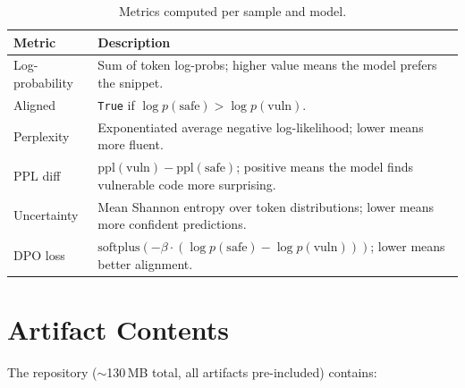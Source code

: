 \documentclass[conference]{IEEEtran}
\begin{document}
\begin{table}[h]
\centering
\caption{Metrics computed per sample and model.}
\label{tab:metrics}
\footnotesize
\begin{tabular}{p{1.8cm}p{5.5cm}}
\toprule
\textbf{Metric} & \textbf{Description} \\
\midrule
Log-probability & Sum of token log-probs; higher value means the model
                  prefers the snippet. \\
Aligned         & \texttt{True} if $\log p(\text{safe}) > \log p(\text{vuln})$. \\
Perplexity      & Exponentiated average negative log-likelihood; lower
                  means more fluent. \\
PPL diff        & $\text{ppl}(\text{vuln}) - \text{ppl}(\text{safe})$;
                  positive means the model finds vulnerable code more surprising. \\
Uncertainty     & Mean Shannon entropy over token distributions; lower means
                  more confident predictions. \\
DPO loss        & $\text{softplus}(-\beta \cdot (\log p(\text{safe}) -
                  \log p(\text{vuln})))$; lower means better alignment. \\
\bottomrule
\end{tabular}
\end{table}

\vspace{0.5cm}
\section{Artifact Contents}

The repository ($\sim$130\,MB total, all artifacts pre-included) contains:
\end{document}
